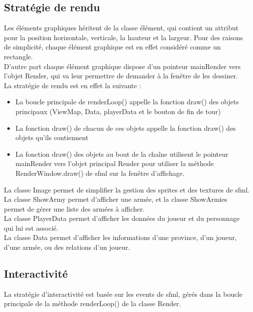 \documentclass[a4paper,12pt]{article}
\begin{document}
\subsection{Stratégie de rendu}
Les éléments graphiques héritent de la classe élément, qui contient un attribut pour la position horizontale, verticale, la hauteur et la largeur. Pour des raisons de simplicité, chaque élément graphique est en effet considéré comme un rectangle.\\
D'autre part chaque élément graphique dispose d'un pointeur mainRender vers l'objet Render, qui va leur permettre de demander à la fenêtre de les dessiner.\\
La stratégie de rendu est en effet la suivante : \\
\begin{itemize}
\item La boucle principale de renderLoop() appelle la fonction draw() des objets principaux (ViewMap, Data, playerData et le bouton de fin de tour)
\item La fonction draw() de chacun de ces objets appelle la fonction draw() des objets qu'ils contiennent
\item La fonction draw() des objets au bout de la chaîne utilisent le pointeur mainRender vers l'objet principal Render pour utiliser la méthode RenderWindow.draw() de sfml sur la fenêtre d'affichage.\\
\end{itemize}

La classe Image permet de simplifier la gestion des sprites et des textures de sfml.\\

La classe ShowArmy permet d'afficher une armée, et la classe ShowArmies permet de gérer une liste des armées à afficher.\\

La classe PlayerData permet d'afficher les données du joueur et du personnage qui lui est associé.\\

La classe Data permet d'afficher les informations d'une province, d'un joueur, d'une armée, ou des relations d'un joueur.\\

\subsection{Interactivité}
La stratégie d'interactivité est basée sur les events de sfml, gérés dans la boucle principale de la méthode renderLoop() de la classe Render.\\
\end{document}
